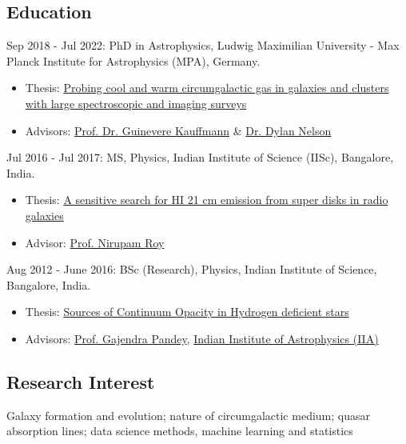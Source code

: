 \documentclass[12pt,letterpaper]{article}
\begin{document}
\subsection{Education}
\begin{list}{}{\cvlist}
  \item Sep 2018 - Jul 2022: PhD in Astrophysics, Ludwig Maximilian University - Max Planck Institute for Astrophysics (MPA), Germany.
\begin{itemize}
    \item Thesis: \href{https://edoc.ub.uni-muenchen.de/30337/}{Probing cool and warm circumgalactic gas in galaxies and clusters with large spectroscopic and imaging surveys}
    \item Advisors: \href{https://www.mpa-garching.mpg.de/galaxyformation}{Prof. Dr. Guinevere Kauffmann} \& \href{https://www.ita.uni-heidelberg.de/~dnelson/}{Dr. Dylan Nelson}
\end{itemize}

\item Jul 2016 - Jul 2017: MS, Physics, Indian Institute of Science (IISc), Bangalore, India.
\begin{itemize}
    \item Thesis: \href{https://raw.githubusercontent.com/abhi0395/mycv/main/files/MS_thesis.pdf}{A sensitive search for HI 21 cm emission from super disks in radio galaxies}
    \item Advisor: \href{http://www.physics.iisc.ernet.in/%7Enroy/}{Prof. Nirupam Roy}
  \end{itemize}
\item Aug 2012 - June 2016: BSc (Research), Physics, Indian Institute of Science, Bangalore, India.
\begin{itemize}
    \item Thesis: \href{https://raw.githubusercontent.com/abhi0395/mycv/main/files/BS_thesis.pdf}{Sources of Continuum Opacity in Hydrogen deficient stars}
    \item Advisors: \href{https://www.iiap.res.in/?q=user/29}{Prof. Gajendra Pandey}, \href{https://www.iiap.res.in/}{Indian Institute of Astrophysics (IIA)}
  \end{itemize}
\end{list}

\subsection{Research Interest}
Galaxy formation and evolution; nature of circumgalactic medium; quasar absorption lines; data science methods, machine learning and statistics
\end{document}
